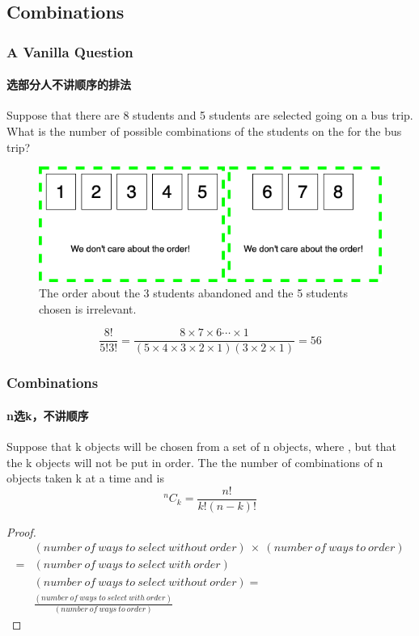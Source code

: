 \documentclass[
	11pt, %
]{beamer}
\begin{document}




\subsection{Combinations}

 
 \begin{frame}
	\frametitle{A Vanilla Question} %
	\framesubtitle{选部分人不讲顺序的排法}
	 Suppose that there are 8 students and 5 students are selected going on a bus trip. What is  the
number of possible combinations of the students on the for the bus trip?

	\begin{figure}
		\includegraphics[width=0.5\linewidth]{Combination_8_5.png}
		\caption{The order about the  3 students abandoned and the 5 students chosen is irrelevant.}
	\end{figure}
	\begin{equation}
		\frac{8!}{5! 3!} = \frac{8\times7\times6\cdots\times1}{(5\times4\times3\times2\times1)(3\times2\times1)} = 56
	\end{equation}
\end{frame}


\begin{frame}
	\frametitle{Combinations} %
	\framesubtitle{n选k，不讲顺序}
	\begin{definition}
		Suppose that k objects will be chosen from a set of n
		objects, where , but that the k objects will not be put in order. The
		 the number of combinations of n objects taken k at a time and is \\
		\begin{equation*}
		  ^nC_k =\frac{n!}{k!(n-k)!}
		\end{equation*}
	\end{definition}

	\begin{proof}
		\begin{equation*}
			\begin{aligned}
				&(number\ of\ ways\ to\ select\ without\ order)\ \times\ (number\ of\ ways\ to\ order)\\ =
&(number\ of\ ways\ to\ select\ with\ order)\\
&(number\ of\ ways\ to\ select\ without\ order) =\\
&\frac{(number\ of\ ways\ to\ select\ with\ order)}{(number\ of\ ways\ to\ order)}
			\end{aligned}
		\end{equation*}
	\end{proof}
\end{frame}
\end{document}

